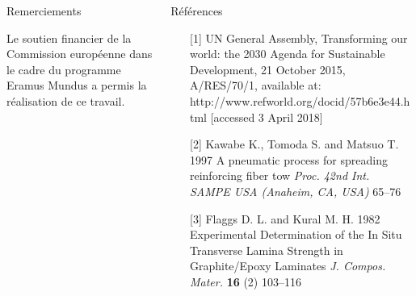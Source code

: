 \documentclass[final]{beamer}
\begin{document}
\begin{frame}

\begin{center}
\begin{minipage}{\textwidth}
\begin{columns}[totalwidth=0.925\textwidth]
\begin{column}{0.4\textwidth}
\begin{block}{\rule[-0.6ex]{0pt}{50pt}\centering Remerciements}
\centering\scriptsize Le soutien financier de la Commission europ\'eenne dans le cadre du programme Eramus Mundus a permis la r\'ealisation de ce travail.
\end{block}
\end{column}
\begin{column}{0.5\textwidth}
\begin{block}{\rule[-0.6ex]{0pt}{50pt}\centering R\'ef\'erences}
\centering
\tiny
\begin{enumerate}
\item[{[}1{]}] UN General Assembly, Transforming our world: the 2030 Agenda for Sustainable Development, 21 October 2015, A/RES/70/1, available at: http://www.refworld.org/docid/57b6e3e44.html [accessed 3 April 2018]
\item[{[}2{]}] Kawabe K., Tomoda S. and Matsuo T. 1997 A pneumatic process for spreading reinforcing fiber tow {\it\tiny Proc. 42nd Int. SAMPE USA (Anaheim, CA, USA)} 65--76
\item[{[}3{]}] Flaggs D. L. and Kural M. H. 1982 Experimental Determination of the In Situ Transverse Lamina Strength in Graphite/Epoxy Laminates {\it \tiny J. Compos. Mater.} {\bf \tiny 16} (2) 103--116

\end{enumerate}
\end{block}
\end{column}
\end{columns}
\end{minipage}
\end{center}
\end{frame}
\end{document}
